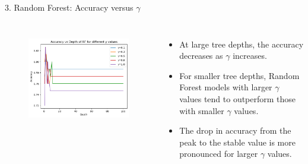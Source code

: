 \documentclass[aspectratio=169,xcolor=dvipsnames]{beamer}
\begin{document}
\begin{frame}{3. Random Forest: Accuracy versus $\gamma$}

    \begin{columns}[c] %
        \begin{figure}
            \centering
            \includegraphics[width=1.15\linewidth]{out/plot12_RF_accuracy_vs_gamma.png}
            \label{fig:1}
        \end{figure}
        

        \begin{itemize}
            \item At large tree depths, the accuracy decreases as $\gamma$ increases.
            \item For smaller tree depths, Random Forest models with larger $\gamma$ values tend to outperform those with smaller $\gamma$ values.
            \item The drop in accuracy from the peak to the stable value is more pronounced for larger $\gamma$ values.
        \end{itemize}
        

    \end{columns}
\end{frame}
\end{document}
